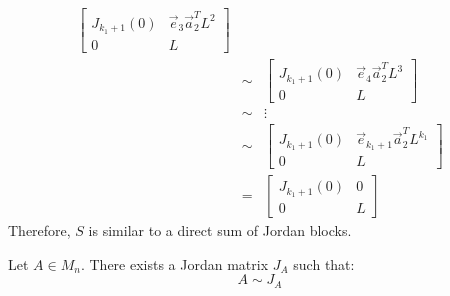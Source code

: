 \documentclass[letterpaper,12pt,fleqn]{article}
\newcommand{\va}{\vec{a}}
\newcommand{\ve}{\vec{e}}
\begin{document}
\begin{theproof}
\begin{description}
\begin{description}
\begin{eqnarray*}
\begin{bmatrix}
          J_{k_1+1}(0) & \ve_3\va_2^TL^2 \\
          0 & L
        \end{bmatrix} \\
        &\sim& \begin{bmatrix}
          J_{k_1+1}(0) & \ve_4\va_2^TL^3 \\
          0 & L
        \end{bmatrix} \\
        &\sim& \vdots \\
        &\sim& \begin{bmatrix}
          J_{k_1+1}(0) & \ve_{k_1+1}\va_2^TL^{k_1} \\
          0 & L
        \end{bmatrix} \\
        &=& \begin{bmatrix}
          J_{k_1+1}(0) & 0 \\
          0 & L
        \end{bmatrix}
      \end{eqnarray*}
      Therefore, $S$ is similar to a direct sum of Jordan blocks.
    \end{description}
  \end{description}
\end{theproof}

\begin{theorem}
  Let $A\in M_n$. There exists a Jordan matrix $J_A$ such that:
  \[A\sim J_A\]
\end{theorem}
\end{document}
